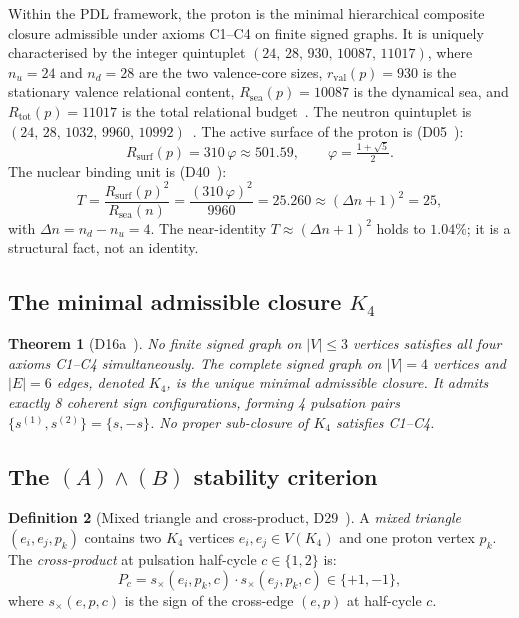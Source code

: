 \documentclass[11pt,a4paper]{article}
\newtheorem{theorem}{Theorem}[section]
\theoremstyle{definition}
\newtheorem{definition}[theorem]{Definition}
\theoremstyle{remark}
\newcommand{\Kfour}{K_4}
\newcommand{\Rsurf}{R_{\mathrm{surf}}}
\newcommand{\Rsea}{R_{\mathrm{sea}}}
\newcommand{\Rtot}{R_{\mathrm{tot}}}
\newcommand{\rval}{r_{\mathrm{val}}}
\newcommand{\Tpdl}{T}
\newcommand{\Dn}{\Delta n}
\newcommand{\nuu}{n_u}
\newcommand{\ndd}{n_d}
\newcommand{\vp}{\varphi}
\newcommand{\protonq}{(24,\,28,\,930,\,10087,\,11017)}
\newcommand{\neutronq}{(24,\,28,\,1032,\,9960,\,10992)}
\begin{document}
Within the PDL framework, the proton is the minimal hierarchical composite closure admissible under axioms C1--C4 on finite signed graphs. It is uniquely characterised by the integer quintuplet $\protonq$, where $\nuu = 24$ and $\ndd = 28$ are the two valence-core sizes, $\rval(p) = 930$ is the stationary valence relational content, $\Rsea(p) = 10087$ is the dynamical sea, and $\Rtot(p) = 11017$ is the total relational budget~\cite{PDL_D01,PDL_D16,PDL_D16a,PDL_D16b}. The neutron quintuplet is $\neutronq$~\cite{PDL_D22}. The active surface of the proton is (D05~\cite{PDL_D05}):
\begin{equation}
  \Rsurf(p) = 310\,\vp \approx 501.59, \qquad \vp = \tfrac{1+\sqrt{5}}{2}.
  \label{eq:Rsurf}
\end{equation}
The nuclear binding unit is (D40~\cite{PDL_D40}):
\begin{equation}
  \Tpdl = \frac{\Rsurf(p)^2}{\Rsea(n)} = \frac{(310\,\vp)^2}{9960} = 25.260 \approx (\Dn+1)^2 = 25,
  \label{eq:T}
\end{equation}
with $\Dn = \ndd - \nuu = 4$. The near-identity $\Tpdl \approx (\Dn+1)^2$ holds to $1.04\%$; it is a structural fact, not an identity.

\subsection{The minimal admissible closure \texorpdfstring{$\Kfour$}{K4}}

\begin{theorem}[D16a~\cite{PDL_D16a}]
\label{thm:K4}
No finite signed graph on $|V| \leq 3$ vertices satisfies all four axioms C1--C4 simultaneously. The complete signed graph on $|V| = 4$ vertices and $|E| = 6$ edges, denoted $\Kfour$, is the unique minimal admissible closure. It admits exactly 8 coherent sign configurations, forming 4 pulsation pairs $\{s^{(1)}, s^{(2)}\} = \{s, -s\}$. No proper sub-closure of $\Kfour$ satisfies C1--C4.
\end{theorem}

\subsection{The \texorpdfstring{$(A)\wedge(B)$}{(A)∧(B)} stability criterion}

\begin{definition}[Mixed triangle and cross-product, D29~\cite{PDL_D29}]
A \emph{mixed triangle} $(e_i, e_j, p_k)$ contains two $\Kfour$ vertices $e_i, e_j \in V(\Kfour)$ and one proton vertex $p_k$. The \emph{cross-product} at pulsation half-cycle $c \in \{1,2\}$ is:
\begin{equation}
  P_c = s_\times(e_i, p_k, c)\cdot s_\times(e_j, p_k, c) \in \{+1,-1\},
  \label{eq:Pc}
\end{equation}
where $s_\times(e, p, c)$ is the sign of the cross-edge $(e, p)$ at half-cycle $c$.
\end{definition}
\end{document}
